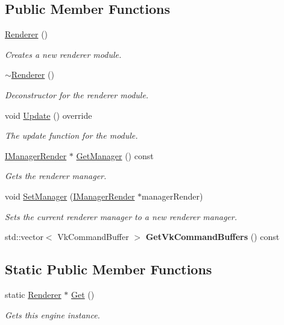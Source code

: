 \subsection*{Public Member Functions}
\begin{DoxyCompactItemize}
\item 
\hyperlink{class_flounder_1_1_renderer_a4c9a104c25dc5f5f5a72c9feccc8994f}{Renderer} ()
\begin{DoxyCompactList}\small\item\em Creates a new renderer module. \end{DoxyCompactList}\item 
\hyperlink{class_flounder_1_1_renderer_ace813f1495d22bb4072de8adadf523f9}{$\sim$\+Renderer} ()
\begin{DoxyCompactList}\small\item\em Deconstructor for the renderer module. \end{DoxyCompactList}\item 
void \hyperlink{class_flounder_1_1_renderer_a3d682d20ea5c7d16029675f6e17bf5d5}{Update} () override
\begin{DoxyCompactList}\small\item\em The update function for the module. \end{DoxyCompactList}\item 
\hyperlink{class_flounder_1_1_i_manager_render}{I\+Manager\+Render} $\ast$ \hyperlink{class_flounder_1_1_renderer_ab9f4629be59275b0f365460a9f47bba7}{Get\+Manager} () const
\begin{DoxyCompactList}\small\item\em Gets the renderer manager. \end{DoxyCompactList}\item 
void \hyperlink{class_flounder_1_1_renderer_a9a3446860570828d9dab930c32ffce5f}{Set\+Manager} (\hyperlink{class_flounder_1_1_i_manager_render}{I\+Manager\+Render} $\ast$manager\+Render)
\begin{DoxyCompactList}\small\item\em Sets the current renderer manager to a new renderer manager. \end{DoxyCompactList}\item 
\mbox{\label{class_flounder_1_1_renderer_addf71b31bc53dd55356000991ad424ee}} 
std\+::vector$<$ Vk\+Command\+Buffer $>$ {\bfseries Get\+Vk\+Command\+Buffers} () const
\end{DoxyCompactItemize}
\subsection*{Static Public Member Functions}
\begin{DoxyCompactItemize}
\item 
static \hyperlink{class_flounder_1_1_renderer}{Renderer} $\ast$ \hyperlink{class_flounder_1_1_renderer_abd1a8162921416ef0dea812685d7a994}{Get} ()
\begin{DoxyCompactList}\small\item\em Gets this engine instance. \end{DoxyCompactList}\end{DoxyCompactItemize}
